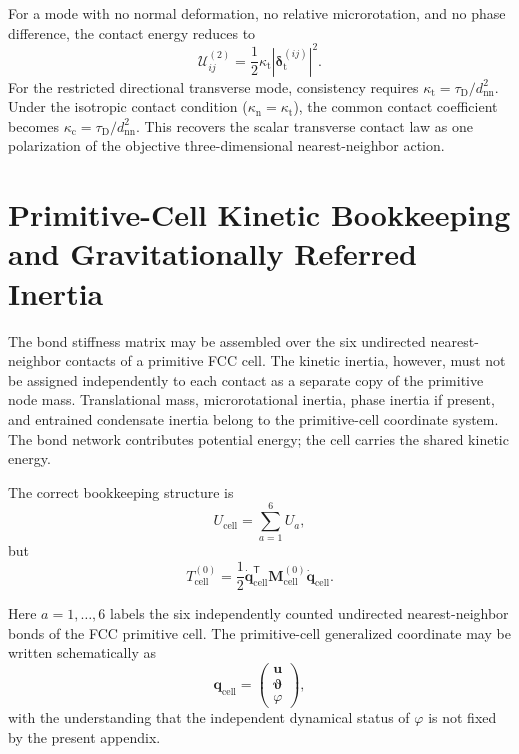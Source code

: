 For a mode with no normal deformation, no relative microrotation, and no phase difference, the contact energy reduces to
\begin{equation}
    \mathcal{U}_{ij}^{(2)} = \frac{1}{2} \kappa_{\mathrm{t}} |\boldsymbol{\delta}_{\mathrm{t}}^{(ij)}|^2.
\end{equation}
For the restricted directional transverse mode, consistency requires $\kappa_{\mathrm{t}} = \tau_{\mathrm{D}} / d_{\mathrm{nn}}^2$. Under the isotropic contact condition ($\kappa_{\mathrm{n}}=\kappa_{\mathrm{t}}$), the common contact coefficient becomes $\kappa_{\mathrm{c}} = \tau_{\mathrm{D}} / d_{\mathrm{nn}}^2$. This recovers the scalar transverse contact law as one polarization of the objective three-dimensional nearest-neighbor action.

\section{Primitive-Cell Kinetic Bookkeeping and Gravitationally Referred Inertia}

The bond stiffness matrix may be assembled over the six undirected nearest-neighbor contacts of a primitive FCC cell. The kinetic inertia, however, must not be assigned independently to each contact as a separate copy of the primitive node mass. Translational mass, microrotational inertia, phase inertia if present, and entrained condensate inertia belong to the primitive-cell coordinate system. The bond network contributes potential energy; the cell carries the shared kinetic energy.

The correct bookkeeping structure is
\begin{equation}
    U_{\mathrm{cell}} = \sum_{a=1}^{6}U_a,
\end{equation}
but
\begin{equation}
    T_{\mathrm{cell}}^{(0)} = \frac{1}{2} \dot{\mathbf{q}}_{\mathrm{cell}}^{\mathsf{T}} \mathbf{M}_{\mathrm{cell}}^{(0)} \dot{\mathbf{q}}_{\mathrm{cell}}.
\end{equation}

Here $a=1,\ldots,6$ labels the six independently counted undirected nearest-neighbor bonds of the FCC primitive cell. The primitive-cell generalized coordinate may be written schematically as
\begin{equation}
    \mathbf{q}_{\mathrm{cell}} =
    \begin{pmatrix}
        \mathbf{u} \\
        \boldsymbol{\vartheta} \\
        \varphi
    \end{pmatrix},
\end{equation}
with the understanding that the independent dynamical status of $\varphi$ is not fixed by the present appendix. 

